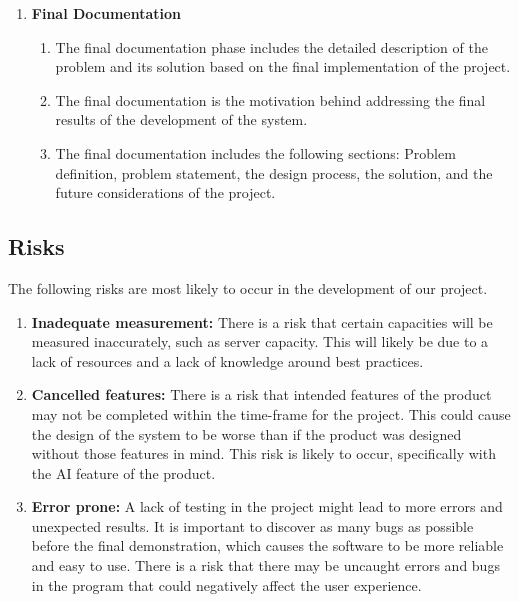 \documentclass[]{article}
\begin{document}
\begin{enumerate}[ ]
	\item \textbf{Final Documentation}
	    \begin{enumerate}[1.]
	        \item The final documentation phase includes the detailed description of the problem and its solution based on the final implementation of the project.
	        \item The final documentation is the motivation behind addressing the final results of the development of the system.
	        \item The final documentation includes the following sections: Problem definition, problem statement, the design process, the solution, and the future considerations of the project.	    
	    \end{enumerate}	
\end{enumerate}

\subsection{Risks}
The following risks are most likely to occur in the development of our project.
\begin{enumerate}
    \item \textbf{Inadequate measurement: } There is a risk that certain capacities will be measured inaccurately, such as server capacity. This will likely be due to a lack of resources and a lack of knowledge around best practices.
    \item \textbf{Cancelled features: }
        There is a risk that intended features of the product may not be completed within the time-frame for the project. This could cause the design of the system to be worse than if the product was designed without those features in mind. This risk is likely to occur, specifically with the AI feature of the product.
    \item \textbf{Error prone: } A lack of testing in the project might lead to more errors and unexpected results. It is important to discover as many bugs as possible before the final demonstration, which causes the software to be more reliable and easy to use. There is a risk that there may be uncaught errors and bugs in the program that could negatively affect the user experience.
\end{enumerate}
\end{document}
